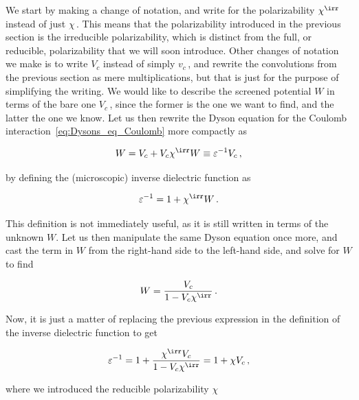 We start by making a change of notation, and write for the polarizability $\chi^{\irr}$ instead of just $\chi$\,.
This means that the polarizability introduced in the previous section is the irreducible polarizability, which is distinct from the full, or reducible, polarizability that we will soon introduce.
Other changes of notation we make is to write $V_c$ instead of simply $v_c$\,, and rewrite the convolutions from the previous section as mere multiplications, but that is just for the purpose of simplifying the writing.
We would like to describe the screened potential $W$ in terms of the bare one $V_c$\,, since the former is the one we want to find, and the latter the one we know.
Let us then rewrite the Dyson equation for the Coulomb interaction~\eqref{eq:Dysons_eq_Coulomb} more compactly as

\begin{equation}
    \label{eq:W_as_of_vc}
    W = V_c + V_c \chi^{\irr} W \equiv \varepsilon^{-1} V_c \,,
\end{equation}

\noindent by defining the (microscopic) inverse dielectric function as

\begin{equation}
    \varepsilon^{-1} = 1 + \chi^{\irr} W\,.
\end{equation}

\noindent This definition is not immediately useful, as it is still written in terms of the unknown $W$.
Let us then manipulate the same Dyson equation once more, and cast the term in $W$ from the right-hand side to the left-hand side, and solve for $W$ to find

\begin{equation}
    W = \frac{V_c}{1 - V_c \chi^{\irr}} \,.
\end{equation}

\noindent Now, it is just a matter of replacing the previous expression in the definition of the inverse dielectric function to get

\begin{equation}
    \label{eq:inverse_dielectric_function}
    \varepsilon^{-1} = 1 + \frac{\chi^{\irr} V_c}{1 - V_c \chi^{\irr}} = 1 + \chi V_c \,,
\end{equation}

\noindent where we introduced the reducible polarizability $\chi$

